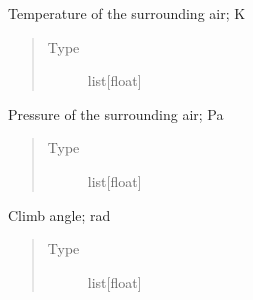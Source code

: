 \documentclass[letterpaper,10pt,english]{sphinxmanual}
\begin{document}
\begin{fulllineitems}
\begin{fulllineitems}
\begin{quote}
\begin{description}
\end{description}\end{quote}

\end{fulllineitems}


\begin{fulllineitems}
\label{\detokenize{modules/mission:mission.Mission.temperature}}
\sphinxAtStartPar
Temperature of the surrounding air; K
\begin{quote}\begin{description}
\item[{Type}] \leavevmode
\sphinxAtStartPar
list{[}float{]}

\end{description}\end{quote}

\end{fulllineitems}


\begin{fulllineitems}
\label{\detokenize{modules/mission:mission.Mission.pressure}}
\sphinxAtStartPar
Pressure of the surrounding air; Pa
\begin{quote}\begin{description}
\item[{Type}] \leavevmode
\sphinxAtStartPar
list{[}float{]}

\end{description}\end{quote}

\end{fulllineitems}


\begin{fulllineitems}
\label{\detokenize{modules/mission:mission.Mission.climb_angle}}
\sphinxAtStartPar
Climb angle; rad
\begin{quote}\begin{description}
\item[{Type}] \leavevmode
\sphinxAtStartPar
list{[}float{]}


\end{description}
\end{quote}
\end{fulllineitems}
\end{fulllineitems}
\end{document}
